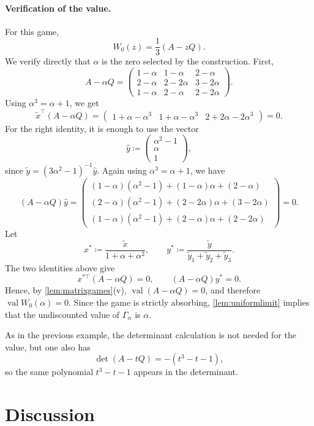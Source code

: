 \documentclass[11pt, a4paper]{article}
\theoremstyle{plain}
\theoremstyle{definition}
\DeclareMathOperator{\val}{val}
\newcommand{\defas}{\coloneqq}
\begin{document}
\paragraph{Verification of the value.}
For this game,
\[
W_0(z)=\frac13(A-zQ).
\]
We verify directly that $\alpha$ is the zero selected by the construction. First,
\[
A-\alpha Q=
\begin{pmatrix}
1-\alpha&1-\alpha&2-\alpha\\
2-\alpha&2-2\alpha&3-2\alpha\\
1-\alpha&2-\alpha&2-2\alpha
\end{pmatrix}.
\]
Using $\alpha^3=\alpha+1$, we get
\[
\tilde x^{\top}(A-\alpha Q)
=\begin{pmatrix}
1+\alpha-\alpha^3&
1+\alpha-\alpha^3&
2+2\alpha-2\alpha^3
\end{pmatrix}
=0 .
\]
For the right identity, it is enough to use the vector
\[
\hat y\defas
\begin{pmatrix}
\alpha^2-1\\ \alpha\\ 1
\end{pmatrix},
\]
since $\tilde y=(3\alpha^2-1)^{-1}\hat y$. Again using $\alpha^3=\alpha+1$, we have
\[
(A-\alpha Q)\hat y=
\begin{pmatrix}
(1-\alpha)(\alpha^2-1)+(1-\alpha)\alpha+(2-\alpha)\\
(2-\alpha)(\alpha^2-1)+(2-2\alpha)\alpha+(3-2\alpha)\\
(1-\alpha)(\alpha^2-1)+(2-\alpha)\alpha+(2-2\alpha)
\end{pmatrix}
=0 .
\]
Let
\[
x^*\defas \frac{\tilde x}{1+\alpha+\alpha^2},
\qquad
y^*\defas \frac{\tilde y}{\tilde y_1+\tilde y_2+\tilde y_3}.
\]
The two identities above give
\[
x^{*\top}(A-\alpha Q)=0,
\qquad
(A-\alpha Q)y^*=0 .
\]
Hence, by \cref{lem:matrixgames}(v), $\val(A-\alpha Q)=0$, and therefore $\val W_0(\alpha)=0$. Since the game is strictly absorbing, \cref{lem:uniformlimit} implies that the undiscounted value of $\Gamma_\alpha$ is $\alpha$.

As in the previous example, the determinant calculation is not needed for the value, but one also has
\[
\det(A-tQ)=-(t^3-t-1),
\]
so the same polynomial $t^3-t-1$ appears in the determinant.


\section{Discussion}
\end{document}
